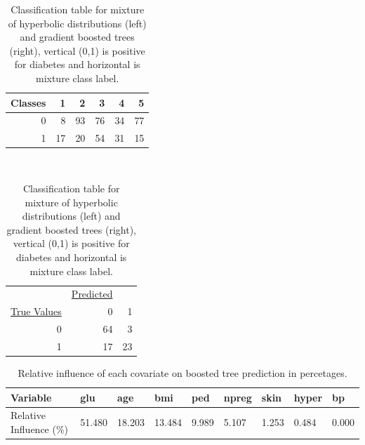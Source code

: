 \documentclass[11pt,letterpaper]{article}
\begin{document}
\begin{table}
\label{classTable}
\caption{Classification table for mixture of hyperbolic distributions (left) and gradient boosted trees (right), vertical (0,1) is positive for diabetes and horizontal is mixture class label.}
\vspace{8pt}
\centering
\begin{tabular}{|r|rrrrr|}
\hline\hline
Classes & 1  & 2  & 3  & 4  & 5  \\
\hline
0       & 8  & 93 & 76 & 34 & 77 \\
1       & 17 & 20 & 54 & 31 & 15 \\ 
\hline \hline
\end{tabular}
$\quad\quad$
\begin{tabular}{|r|rr|}
\hline\hline
          & \underline{Predicted} &   \\
\underline{True Values} & 0         & 1  \\
\hline
0           & 64        & 3  \\
1           & 17        & 23 \\
\hline\hline
\end{tabular}
\end{table}

\begin{table}[!h]
\centering
\label{relInflu}
\caption{Relative influence of each covariate on boosted tree prediction in percetages. }
\vspace{5pt}
\begin{tabular}{|l|llllllll|}
\hline\hline 
Variable                & glu    & age    & bmi    & ped   & npreg & skin  & hyper & bp    \\ 
\hline
Relative Influence (\%) & 51.480 & 18.203 & 13.484 & 9.989 & 5.107 & 1.253 & 0.484 & 0.000  \\
\hline\hline
\end{tabular}
\end{table}
\end{document}

